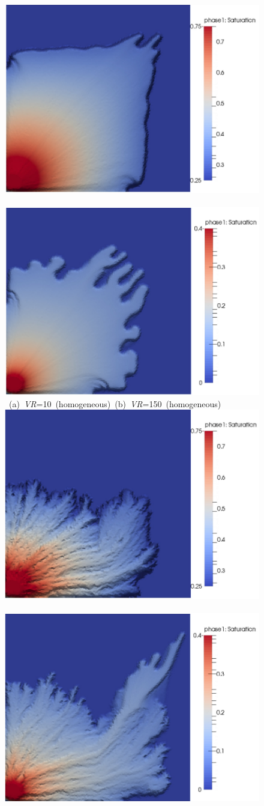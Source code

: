 \begin{figure}[ht]
\vbox{
\hbox{\includegraphics[width=.5\textwidth]{./Pics1/Saffman_homogeneous_VR10/ST_Homog_VR10_D2201_W2b.pdf}
       \includegraphics[width=.5\textwidth]{./Pics1/Saffman_homogeneous_VR150/ST_Homog_VR150_D5003_W2b.pdf}}
\hbox{\hspace{0.25cm} (a) {\it VR}=10 (homogeneous) \hspace{1.5cm} (b) {\it VR}=150 (homogeneous) }
\vspace{0.5cm}
\hbox{\includegraphics[width=.5\textwidth]{./Pics1/Saffman_heterogeneous_VR10/ST_Heterog_VR10_D11000_W2b.pdf}
       \includegraphics[width=.5\textwidth]{./Pics1/Saffman_heterogeneous_VR150/ST_Heterog_VR150_D6500_W2b.pdf}}
}
\end{figure}
